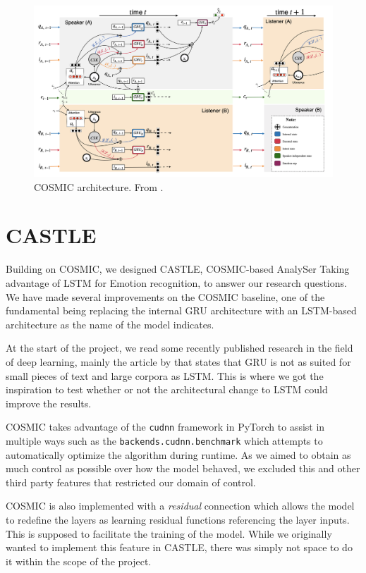 \documentclass[nofilelist]{cslthse-msc}
\begin{document}


\begin{figure}[!ht]
    \centering
    \includegraphics[scale=0.3]{msccls/explanatory_images/COSMIC_arch.png}
    \caption{COSMIC architecture. From \citet{ghosal2020cosmic}.}
    \label{fig:COSMIC_arch}
\end{figure}


\section{CASTLE}
Building on COSMIC, we designed CASTLE, COSMIC-based AnalySer Taking advantage of LSTM for Emotion recognition, to answer our research questions. We have made several improvements on the COSMIC baseline, one of the fundamental being replacing the internal GRU architecture with an LSTM-based architecture as the name of the model indicates. 

At the start of the project, we read some recently published research in the field of deep learning, mainly the article by \citet{edseee.922172720200601} that states that GRU is not as suited for small pieces of text and large corpora as LSTM. This is where we got the inspiration to test whether or not the architectural change to LSTM could improve the results. 


COSMIC takes advantage of the \texttt{cudnn} framework in PyTorch to assist in multiple ways such as the \texttt{backends.cudnn.benchmark} which attempts to automatically optimize the algorithm during runtime. As we aimed to obtain as much control as possible over how the model behaved, we excluded this and other third party features that restricted our domain of control.  

COSMIC is also implemented with a \textit{residual} connection \citep{he2015deep} which allows the model to redefine the layers as learning residual functions referencing the layer inputs. This is supposed to facilitate the training of the model. While we originally wanted to implement this feature in CASTLE, there was simply not space to do it within the scope of the project. 
\end{document}
